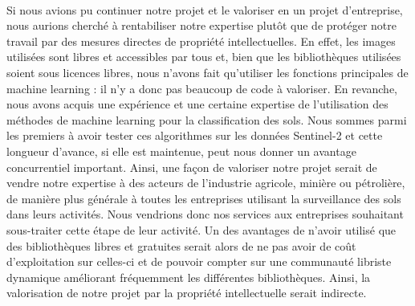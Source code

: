 \documentclass[a4paper,10pt]{article}
\begin{document}
\paragraph{}
Si nous avions pu continuer notre projet et le valoriser en un projet d'entreprise, nous aurions cherché à rentabiliser notre expertise plutôt que de protéger notre travail par des mesures directes de propriété intellectuelles. En effet, les images utilisées sont libres et accessibles par tous et, bien que les bibliothèques utilisées soient sous licences libres, nous n'avons fait qu'utiliser les fonctions principales de machine learning : il n'y a donc pas beaucoup de code à valoriser. En revanche, nous avons acquis une expérience et une certaine expertise de l'utilisation des méthodes de machine learning pour la classification des sols. Nous sommes parmi les premiers à avoir tester ces algorithmes sur les données Sentinel-2 et cette longueur d'avance, si elle est maintenue, peut nous donner un avantage concurrentiel important. Ainsi, une façon de valoriser notre projet serait de vendre notre expertise à des acteurs de l'industrie agricole, minière ou pétrolière, de manière plus générale à toutes les entreprises utilisant la surveillance des sols dans leurs activités. Nous vendrions donc nos services aux entreprises souhaitant sous-traiter cette étape de leur activité. Un des avantages de n'avoir utilisé que des bibliothèques libres et gratuites serait alors de ne pas avoir de coût d'exploitation sur celles-ci et de pouvoir compter sur une communauté libriste dynamique améliorant fréquemment les différentes bibliothèques. Ainsi, la valorisation de notre projet par la propriété intellectuelle serait indirecte.
\end{document}

